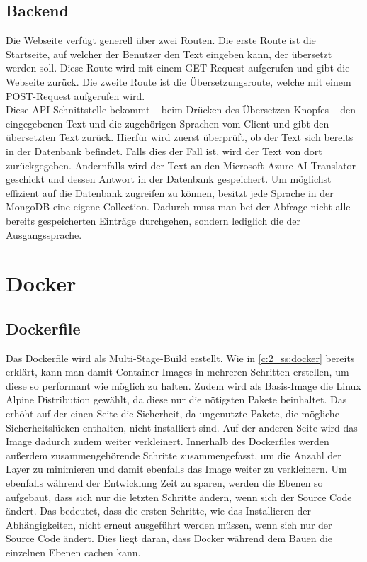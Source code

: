 \subsection{Backend}\label{c:3_ss:backend}
Die Webseite verfügt generell über zwei Routen. Die erste Route ist die Startseite, auf welcher der Benutzer den Text eingeben kann, der übersetzt werden soll. Diese Route wird mit einem GET-Request aufgerufen und gibt die Webseite zurück. Die zweite Route ist die Übersetzungsroute, welche mit einem POST-Request aufgerufen wird.\\
Diese \ac{API}-Schnittstelle bekommt -- beim Drücken des Übersetzen-Knopfes -- den eingegebenen Text und die zugehörigen Sprachen vom Client und gibt den übersetzten Text zurück. Hierfür wird zuerst überprüft, ob der Text sich bereits in der Datenbank befindet. Falls dies der Fall ist, wird der Text von dort zurückgegeben. Andernfalls wird der Text an den Microsoft Azure \ac{AI} Translator geschickt und dessen Antwort in der Datenbank gespeichert. Um möglichst effizient auf die Datenbank zugreifen zu können, besitzt jede Sprache in der MongoDB eine eigene Collection. Dadurch muss man bei der Abfrage nicht alle bereits gespeicherten Einträge durchgehen, sondern lediglich die der Ausgangssprache.


\section{Docker}\label{c:3_s:docker}

\subsection{Dockerfile}\label{c:3_ss:dockerfile}
Das Dockerfile wird als Multi-Stage-Build erstellt. Wie in \autoref{c:2_ss:docker} bereits erklärt, kann man damit Container-Images in mehreren Schritten erstellen, um diese so performant wie möglich zu halten. Zudem wird als Basis-Image die Linux Alpine Distribution gewählt, da diese nur die nötigsten Pakete beinhaltet. Das erhöht auf der einen Seite die Sicherheit, da ungenutzte Pakete, die mögliche Sicherheitslücken enthalten, nicht installiert sind. Auf der anderen Seite wird das Image dadurch zudem weiter verkleinert. Innerhalb des Dockerfiles werden außerdem zusammengehörende Schritte zusammengefasst, um die Anzahl der Layer zu minimieren und damit ebenfalls das Image weiter zu verkleinern. Um ebenfalls während der Entwicklung Zeit zu sparen, werden die Ebenen so aufgebaut, dass sich nur die letzten Schritte ändern, wenn sich der Source Code ändert. Das bedeutet, dass die ersten Schritte, wie das Installieren der Abhängigkeiten, nicht erneut ausgeführt werden müssen, wenn sich nur der Source Code ändert. Dies liegt daran, dass Docker während dem Bauen die einzelnen Ebenen cachen kann.

